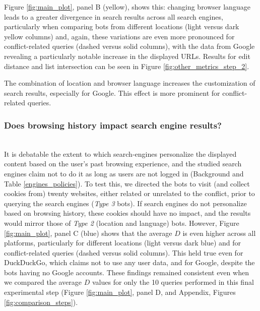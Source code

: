 Figure \ref{fig:main_plot}, panel B (yellow), shows this: changing browser language leads to a greater divergence in search results across all search engines, particularly when comparing bots from different locations (light versus dark yellow columns) and, again, these variations are even more pronounced for conflict-related queries (dashed versus solid columns), with the data from Google revealing a particularly notable increase in the displayed URLs. Results for edit distance and list intersection can be seen in Figure \ref{fig:other_metrics_step_2}.



\begin{takeaway}
    \takeawaytitle{}
    The combination of location and browser language increases the customization of search results, especially for Google. This effect is more prominent for conflict-related queries.
\end{takeaway}

\subsubsection{Does browsing history impact search engine results?}
\hfill\\
It is debatable the extent to which search-engines personalize the displayed content based on the user's past browsing experience, and the studied search engines claim not to do it as long as users are not logged in (Background and Table \ref{engines_policies}). To test this, we directed the bots to visit (and collect cookies from) twenty websites, either related or unrelated to the conflict, prior to querying the search engines (\textit{Type 3} bots). If search engines do not personalize based on browsing history, these cookies should have no impact, and the results would mirror those of \textit{Type 2} (location and language) bots.
However, Figure \ref{fig:main_plot}, panel C (blue) shows that the average $D$ is even higher across all platforms, particularly for different locations (light versus dark blue) and for conflict-related queries (dashed versus solid columns). This held true even for DuckDuckGo, which claims not to use any user data, and for Google, despite the bots having no Google accounts. These findings remained consistent even when we compared the average $D$ values for only the 10 queries performed in this final experimental step (Figure \ref{fig:main_plot}, panel D, and Appendix, Figures \ref{fig:comparison_steps}).

